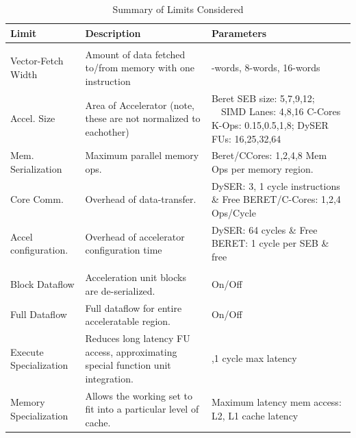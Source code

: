 \begin{table}
\footnotesize
\def\arraystretch{1.1}
\setlength{\tabcolsep}{.12em}

\begin{tabular}{>{\RaggedRight}p{0.9in}>{\RaggedRight}p{2.4in}>{\RaggedRight}p{3.2in}}  \toprule
    \textbf{Limit} & \textbf{Description} & \textbf{Parameters} \\ \midrule

    \multicolumn{2}{c}{Practical Limitations}\\ \midrule

    Vector-Fetch Width
    & Amount of data fetched to/from memory with one instruction
    & 4-words, 8-words, 16-words
    \\    

   Accel. Size
   & Area of Accelerator
    (note, these are not normalized to eachother)
   & Beret SEB size: 5,7,9,12;  \ \ 
     SIMD Lanes: 4,8,16 \newline
     C-Cores K-Ops: 0.15,0.5,1,8;
     DySER FUs: 16,25,32,64
   \\

   Mem. \newline Serialization
   & Maximum parallel memory ops.
   & Beret/CCores: 1,2,4,8 Mem Ops per memory region.
   \\

   Core Comm.
   & Overhead of data-transfer.
   & DySER: 3, 1 cycle instructions \& Free \newline
     BERET/C-Cores: 1,2,4 Ops/Cycle
   \\
 
   Accel configuration.
   & Overhead of accelerator configuration time
   & DySER: 64 cycles \& Free \newline
     BERET: 1 cycle per SEB \& free
   \\ \midrule


   \multicolumn{2}{c}{Fundamental Limitations}\\ \midrule
   
   Block Dataflow
   & Acceleration unit blocks are de-serialized.
   & On/Off
   \\

   Full Dataflow
   & Full dataflow for entire acceleratable region.
   & On/Off
   \\

   Execute \newline Specialization
   & Reduces long latency FU access, approximating special function unit integration.
   & 4,1 cycle max latency
   \\   

   Memory \newline Specialization
   & Allows the working set to fit into a particular level of cache.
   & Maximum latency mem access: L2, L1 cache latency
   \\
    
\bottomrule
  \end{tabular}
  \caption{Summary of Limits Considered}
  \label{tab:limitdef}
\vspace{-0.1in}
\end{table}


